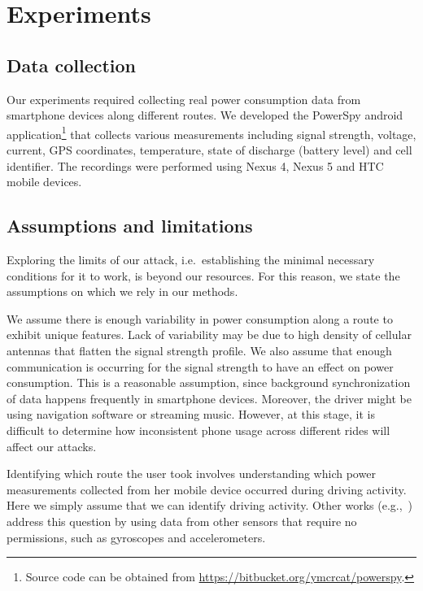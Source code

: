 \section{Experiments} \label{sec:Experiments}

\subsection{Data collection} \label{sec:data-collection}
Our experiments required collecting real power consumption data from smartphone devices along
different routes. We developed the PowerSpy android application\footnote{Source code can be obtained from \newline
  \textcolor{blue}{\url{https://bitbucket.org/ymcrcat/powerspy}}.}
that collects various
measurements including signal strength, voltage, current, GPS coordinates, temperature,
state of discharge (battery level) and cell identifier.
The recordings were performed using Nexus 4, Nexus 5 and HTC mobile devices.

\subsection{Assumptions and limitations}

Exploring the limits of our attack, i.e.\ establishing the minimal necessary conditions for it to work,
is beyond our resources. For this reason, we state the assumptions on which we rely in our methods.

We assume there is enough variability in power consumption along a route to exhibit unique features.
Lack of variability may be due to high density of cellular antennas that flatten the signal strength profile.
We also assume that enough communication is occurring for the signal strength to have an effect on
power consumption.
This is a reasonable assumption, since background synchronization of data happens frequently in
smartphone devices. Moreover, the driver might be using navigation software or streaming music.
However, at this stage, it is difficult to determine how inconsistent phone usage across different rides will
affect our attacks.

Identifying which route the user took involves understanding which
power measurements collected from her mobile device occurred during
driving activity.  Here we simply assume that we can identify driving
activity.  Other works (e.g.,~\cite{Mohan2008}) address this question
by using data from other sensors that require no permissions, such as
gyroscopes and accelerometers.

